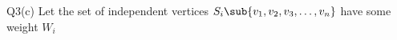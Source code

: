 \begin{problem}
  {Q3(c)}
  Let the set of independent vertices $S_i \sub \{v_1,v_2,v_3,\dots,v_n\}$ have some weight $W_i$
\end{problem}
